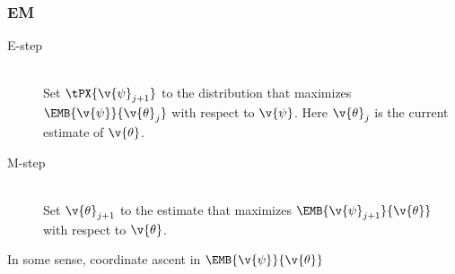 \documentclass[t,professionalfont,10pt]{beamer}
\newcommand{\Th}{\v{\theta}}
\begin{document}
\begin{frame}
	\frametitle{EM}
\begin{description}
  \item[E-step]\hfill\\
  Set $\tPX{\v{\psi}_{j+1}}$ to the distribution that maximizes $\EMB{\v{\psi}}{\Th_j}$
  with respect to $\v{\psi}$. Here $\Th_j$ is the current estimate of $\Th$.  
  \item[M-step]\hfill\\ 
  Set $\Th_{j+1}$ to the estimate that maximizes $\EMB{\v{\psi}_{j+1}}{\Th}$ with respect to $\Th$.
\end{description}

In some sense, coordinate ascent in $\EMB{\v{\psi}}{\Th}$ 
\end{frame}



% 
\end{document}
